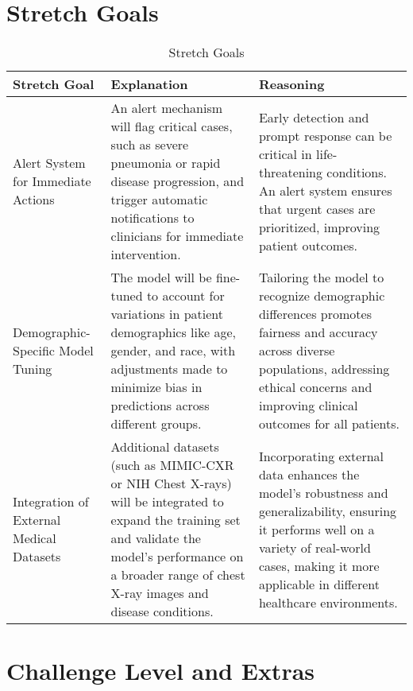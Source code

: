 \documentclass{article}
\begin{document}
\section{Stretch Goals}
\begin{table}[ht]
    \hspace*{-2cm}
    \centering
    \begin{tabular}{|p{3cm}|p{6cm}|p{6cm}|}
    \hline
    \textbf{Stretch Goal} & \textbf{Explanation} & \textbf{Reasoning} \\ \hline

    Alert System for Immediate Actions & An alert mechanism will flag critical cases, such as severe pneumonia or rapid disease progression, and trigger automatic notifications to clinicians for immediate intervention. & Early detection and prompt response can be critical in life-threatening conditions. An alert system ensures that urgent cases are prioritized, improving patient outcomes. \\ \hline

    Demographic-Specific Model Tuning & The model will be fine-tuned to account for variations in patient demographics like age, gender, and race, with adjustments made to minimize bias in predictions across different groups. & Tailoring the model to recognize demographic differences promotes fairness and accuracy across diverse populations, addressing ethical concerns and improving clinical outcomes for all patients. \\ \hline

    Integration of External Medical Datasets & Additional datasets (such as MIMIC-CXR or NIH Chest X-rays) will be integrated to expand the training set and validate the model’s performance on a broader range of chest X-ray images and disease conditions. & Incorporating external data enhances the model’s robustness and generalizability, ensuring it performs well on a variety of real-world cases, making it more applicable in different healthcare environments. \\ \hline

    \end{tabular}
    \caption{Stretch Goals}
\end{table}
\section{Challenge Level and Extras}
\end{document}
